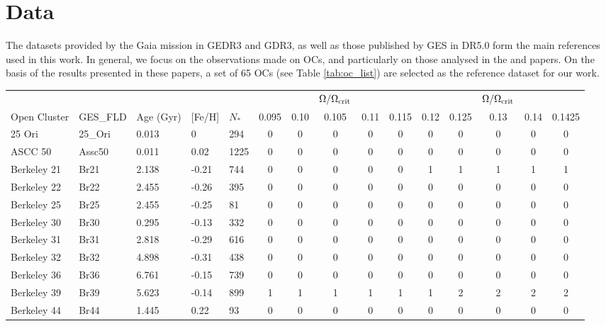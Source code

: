 \documentclass[fleqn,usenatbib]{mnras}
\begin{document}
\section{Data} \label{sec_method}
The datasets provided by the Gaia mission in GEDR3 and GDR3, as well as those published by GES in DR5.0 form the main references used in this work. In general, we focus on the observations made on OCs, and particularly on those analysed in the \cite{Bragaglia2022} and \cite{Randich2022} papers. On the basis of the results presented in these papers, a set of 65 OCs (see Table \ref{tab:oc_list}) are selected as the reference dataset for our work. 

\begin{table}
	\centering
	\begin{tabular}{|l l l l l || c c c c c | c c c c c|} 
		\hline
             & & & & & & & $\Omega / \Omega_{\mathrm{crit}}$ & & & & & $\Omega / \Omega_{\mathrm{crit}}$ & & \\
		Open Cluster & GES\_FLD & Age (Gyr) & [Fe/H] & $N_*$ & 0.095 & 0.10 & 0.105 & 0.11 & 0.115 & 0.12 & 0.125 & 0.13 & 0.14 & 0.1425\\
		\hline
            25 Ori & 25\_Ori & 0.013 & 0 & 294 & 0 & 0 & 0 & 0 & 0 & 0 & 0 & 0 & 0 & 0\\
            ASCC 50 & Assc50 & 0.011 & 0.02 & 1225 & 0 & 0 & 0 & 0 & 0 & 0 & 0 & 0 & 0 & 0\\
            \rowcolor{lightgray}
            Berkeley 21 & Br21 & 2.138 & -0.21 & 744 & 0 & 0 & 0 & 0 & 0 & 1 & 1 & 1 & 1 & 1\\
            Berkeley 22 & Br22 & 2.455 & -0.26 & 395 & 0 & 0 & 0 & 0 & 0 & 0 & 0 & 0 & 0 & 0\\
            Berkeley 25 & Br25 & 2.455 & -0.25 & 81 & 0 & 0 & 0 & 0 & 0 & 0 & 0 & 0 & 0 & 0\\
            Berkeley 30 & Br30 & 0.295 & -0.13 & 332 & 0 & 0 & 0 & 0 & 0 & 0 & 0 & 0 & 0 & 0\\
            Berkeley 31 & Br31 & 2.818 & -0.29 & 616 & 0 & 0 & 0 & 0 & 0 & 0 & 0 & 0 & 0 & 0\\
            Berkeley 32 & Br32 & 4.898 & -0.31 & 438 & 0 & 0 & 0 & 0 & 0 & 0 & 0 & 0 & 0 & 0\\
            Berkeley 36 & Br36 & 6.761 & -0.15 & 739 & 0 & 0 & 0 & 0 & 0 & 0 & 0 & 0 & 0 & 0\\
            \rowcolor{lightgray}
            Berkeley 39 & Br39 & 5.623 & -0.14 & 899 & 1 & 1 & 1 & 1 & 1 & 1 & 2 & 2 & 2 & 2\\
            Berkeley 44 & Br44 & 1.445 & 0.22 & 93 & 0 & 0 & 0 & 0 & 0 & 0 & 0 & 0 & 0 & 0\\

\end{tabular}
\end{table}
\end{document}
